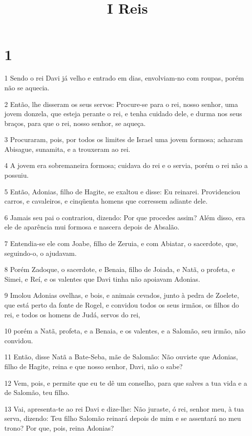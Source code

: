 

\title{I Reis}


\chapter{1}

\par 1 Sendo o rei Davi já velho e entrado em dias, envolviam-no com roupas, porém não se aquecia.
\par 2 Então, lhe disseram os seus servos: Procure-se para o rei, nosso senhor, uma jovem donzela, que esteja perante o rei, e tenha cuidado dele, e durma nos seus braços, para que o rei, nosso senhor, se aqueça.
\par 3 Procuraram, pois, por todos os limites de Israel uma jovem formosa; acharam Abisague, sunamita, e a trouxeram ao rei.
\par 4 A jovem era sobremaneira formosa; cuidava do rei e o servia, porém o rei não a possuiu.
\par 5 Então, Adonias, filho de Hagite, se exaltou e disse: Eu reinarei. Providenciou carros, e cavaleiros, e cinqüenta homens que corressem adiante dele.
\par 6 Jamais seu pai o contrariou, dizendo: Por que procedes assim? Além disso, era ele de aparência mui formosa e nascera depois de Absalão.
\par 7 Entendia-se ele com Joabe, filho de Zeruia, e com Abiatar, o sacerdote, que, seguindo-o, o ajudavam.
\par 8 Porém Zadoque, o sacerdote, e Benaia, filho de Joiada, e Natã, o profeta, e Simei, e Reí, e os valentes que Davi tinha não apoiavam Adonias.
\par 9 Imolou Adonias ovelhas, e bois, e animais cevados, junto à pedra de Zoelete, que está perto da fonte de Rogel, e convidou todos os seus irmãos, os filhos do rei, e todos os homens de Judá, servos do rei,
\par 10 porém a Natã, profeta, e a Benaia, e os valentes, e a Salomão, seu irmão, não convidou.
\par 11 Então, disse Natã a Bate-Seba, mãe de Salomão: Não ouviste que Adonias, filho de Hagite, reina e que nosso senhor, Davi, não o sabe?
\par 12 Vem, pois, e permite que eu te dê um conselho, para que salves a tua vida e a de Salomão, teu filho.
\par 13 Vai, apresenta-te ao rei Davi e dize-lhe: Não juraste, ó rei, senhor meu, à tua serva, dizendo: Teu filho Salomão reinará depois de mim e se assentará no meu trono? Por que, pois, reina Adonias?
